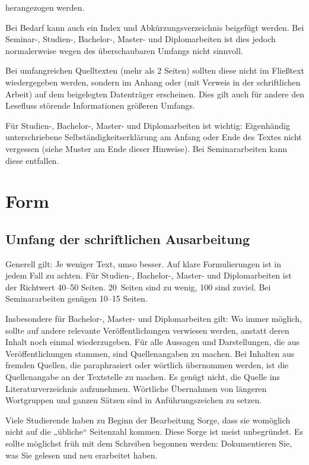 \documentclass[
    fontsize=12pt,
    headings=small,
    parskip=half,           %
    bibliography=totoc,
    numbers=noenddot,       %
    open=any,               %
    ]{scrreprt}
\begin{document}
herangezogen werden.

Bei Bedarf kann auch ein Index und Abkürzungsverzeichnis beigefügt werden. Bei Seminar-, Studien-, Bachelor-, Master- und Diplomarbeiten ist dies jedoch normalerweise wegen des überschaubaren Umfangs nicht sinnvoll.

Bei umfangreichen Quelltexten (mehr als 2 Seiten) sollten diese nicht im Fließtext wiedergegeben werden, sondern im Anhang oder (mit Verweis in der schriftlichen Arbeit) auf dem beigelegten Datenträger erscheinen. Dies gilt auch für andere den Lesefluss störende Informationen größeren Umfangs. 

Für Studien-, Bachelor-, Master- und Diplomarbeiten ist wichtig: Eigenhändig unterschriebene Selbständigkeitserklärung am Anfang oder Ende des Textes nicht vergessen (siehe Muster am Ende dieser Hinweise). Bei Seminararbeiten kann diese entfallen.

\chapter{Form}

\section{Umfang der schriftlichen Ausarbeitung}

Generell gilt: Je weniger Text, umso besser. Auf klare Formulierungen ist in jedem Fall zu achten. Für Studien-, Bachelor-, Master- und Diplomarbeiten ist der Richtwert 40--50 Seiten. 20~Seiten sind zu wenig, 100 sind zuviel. Bei Seminararbeiten genügen 10--15 Seiten.

Insbesondere für Bachelor-, Master- und Diplomarbeiten gilt: Wo immer möglich, sollte auf andere relevante Veröffentlichungen verwiesen werden, anstatt deren Inhalt noch einmal wiederzugeben. Für alle Aussagen und Darstellungen, die aus Veröffentlichungen stammen, sind Quellenangaben zu machen. Bei Inhalten aus fremden Quellen, die paraphrasiert oder wörtlich übernommen werden, ist die Quellenangabe an der Textstelle zu machen. Es genügt nicht, die Quelle ins Literaturverzeichnis aufzunehmen. Wörtliche Übernahmen von längeren Wortgruppen und ganzen Sätzen sind in Anführungszeichen zu setzen.

Viele Studierende haben zu Beginn der Bearbeitung Sorge, dass sie womöglich nicht auf die „übliche“ Seitenzahl kommen. Diese Sorge ist meist unbegründet. Es sollte möglichst früh mit dem Schreiben begonnen werden: Dokumentieren Sie, was Sie gelesen und neu erarbeitet haben.
\end{document}
